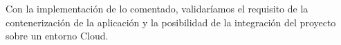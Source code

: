 Con la implementación de lo comentado, validaríamos el requisito de la contenerización de la aplicación y la posibilidad de la integración del proyecto sobre un entorno Cloud.




